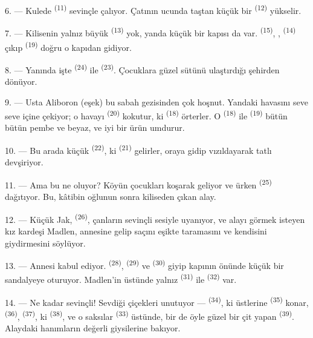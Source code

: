 6. --- Kulede  \textsuperscript{(11)} sevinçle çalıyor. Çatının
ucunda taştan küçük bir  \textsuperscript{(12)} yükselir.

7. --- Kilisenin yalnız büyük  \textsuperscript{(13)} yok,
yanda küçük bir kapısı da var.  \textsuperscript{(15)},
,  \textsuperscript{(14)} çıkıp
 \textsuperscript{(19)} doğru o kapıdan gidiyor.

8. --- Yanında işte  \textsuperscript{(24)} ile
 \textsuperscript{(23)}. Çocuklara güzel sütünü ulaştırdığı
şehirden dönüyor.

\VUsaut{4.0mm}
\VUsaut{3.4mm}

9. --- Usta Aliboron (eşek) bu sabah gezisinden çok hoşnut. Yandaki
 havasını seve seve içine çekiyor; o havayı
 \textsuperscript{(20)} kokutur, ki
 \textsuperscript{(18)} örterler. O
 \textsuperscript{(18)} ile
 \textsuperscript{(19)} bütün bütün pembe ve beyaz,
ve iyi bir ürün umdurur.

10. --- Bu arada küçük  \textsuperscript{(22)}, ki
 \textsuperscript{(21)} gelirler, oraya gidip vızıldayarak
tatlı  devşiriyor.

11. --- Ama bu ne oluyor? Köyün çocukları koşarak geliyor ve ürken
 \textsuperscript{(25)} dağıtıyor. Bu, kâtibin oğlunun
 sonra kiliseden çıkan alay.

12. --- Küçük Jak,  \textsuperscript{(26)}, çanların sevinçli
sesiyle uyanıyor, ve alayı görmek isteyen kız kardeşi Madlen, annesine gelip
saçını eşikte taramasını ve kendisini giydirmesini söylüyor.

13. --- Annesi kabul ediyor.  \textsuperscript{(28)},
 \textsuperscript{(29)} ve 
\textsuperscript{(30)} giyip kapının önünde küçük bir sandalyeye oturuyor.
Madlen'in üstünde yalnız  \textsuperscript{(31)} ile
 \textsuperscript{(32)} var.

14. --- Ne kadar sevinçli! Sevdiği çiçekleri unutuyor —
 \textsuperscript{(34)}, ki üstlerine
 \textsuperscript{(35)} konar, 
\textsuperscript{(36)},  \textsuperscript{(37)}, ki
 \textsuperscript{(38)}, ve o saksılar
 \textsuperscript{(33)} üstünde, bir de öyle güzel bir çit
yapan  \textsuperscript{(39)}. Alaydaki hanımların değerli giysilerine
bakıyor.

